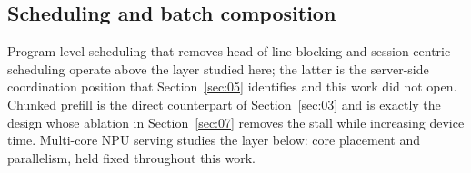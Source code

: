 \subsection{Scheduling and batch composition}

Program-level scheduling that removes head-of-line blocking \cite{autellix2025} and session-centric scheduling \cite{smetric2026} operate above the layer studied here; the latter is the server-side coordination position that Section~\ref{sec:05} identifies and this work did not open. Chunked prefill \cite{sarathi2024} is the direct counterpart of Section~\ref{sec:03} and is exactly the design whose ablation in Section~\ref{sec:07} removes the stall while increasing device time. Multi-core NPU serving \cite{multicorenpu2025} studies the layer below: core placement and parallelism, held fixed throughout this work.
